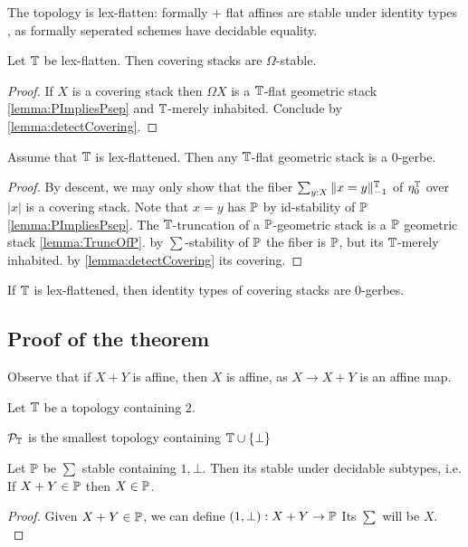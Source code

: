 \begin{example}
	The \etale topology is lex-flatten:
	formally \etale $+$ flat affines are stable under identity types , as formally \etale seperated schemes have decidable equality.  %
\end{example}

\begin{prop}{\label{prop:LexflattenOmegaStable}}
	Let $\mathbb{T}$ be lex-flatten. Then covering stacks are $\Omega$-stable. %
\end{prop}
\begin{proof}
	If $X$ is a covering stack then $\Omega X$ is a $\mathbb{T}$-flat geometric stack \ref{lemma:PImpliesPsep} and $\mathbb{T}$-merely inhabited. Conclude by  \ref{lemma:detectCovering}.
\end{proof}
\begin{lemma}
	Assume that $\mathbb{T}$ is lex-flattened. Then any $\mathbb{T}$-flat geometric stack is a 0-gerbe.
\end{lemma}
\begin{proof}
	By descent, we may only show that the fiber $\sum_{y: X} \|x = y\|_{-1}^{\mathbb{T}}$ of $\eta_0^{\mathbb{T}}$ over $|x|$ is a covering stack. Note that $x = y$ has $\mathbb{P}$ by id-stability of $\mathbb{P}$ \ref{lemma:PImpliesPsep}. The $\mathbb{T}$-truncation of a $\mathbb{P}$-geometric stack is a $\mathbb{P}$ geometric stack \ref{lemma:TruncOfP}. by $\sum$-stability of $\mathbb{P}$ the fiber is $\mathbb{P}$, but its $\mathbb{T}$-merely inhabited. by \ref{lemma:detectCovering} its covering.
\end{proof}
\begin{corollary}
	If $\mathbb{T}$ is lex-flattened, then identity types of covering stacks are 0-gerbes.
\end{corollary}
\subsection{Proof of the theorem}
 Observe that if $X + Y$ is affine, then $X$ is affine, as $X \to X + Y$ is an affine map.

Let $\mathbb{T}$ be a topology containing $2$.%
\begin{definition}
	$\mathcal{P}_{\mathbb{T}}$ is the smallest topology containing $\mathbb{T} \cup \{\bot\}$
\end{definition}
\begin{lemma}{\label{lemma:SummandStable}}
	Let $\mathbb{P}$ be $\sum$ stable containing $1 , \bot$. Then its stable under decidable subtypes, i.e. If $X + Y \in \mathbb{P}$ then $X \in \mathbb{P}$.
\end{lemma}
\begin{proof}
	Given $X + Y \in \mathbb{P}$, we can define $(1, \bot) : X + Y \to \mathbb{P}$ Its $\sum$ will be $X$. \\
\end{proof}

